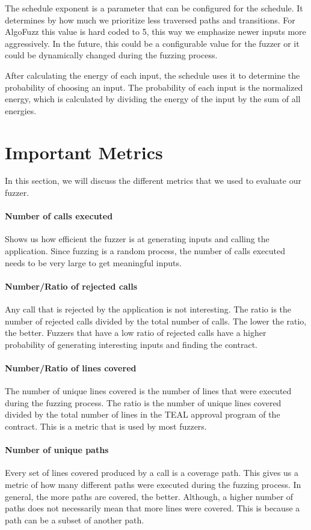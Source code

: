The schedule exponent is a parameter that can be configured for the schedule.
It determines by how much we prioritize less traversed paths and transitions.
For AlgoFuzz this value is hard coded to 5, this way we emphasize newer inputs more aggressively.
In the future, this could be a configurable value for the fuzzer or it could be dynamically changed during the fuzzing process.

After calculating the energy of each input, the schedule uses it to determine the probability of choosing an input.
The probability of each input is the normalized energy, which is calculated by dividing the energy of the input by the sum of all energies.

\section{Important Metrics}
In this section, we will discuss the different metrics that we used to evaluate our fuzzer.

\paragraph{Number of calls executed} Shows us how efficient the fuzzer is at generating inputs and calling the application.
Since fuzzing is a random process, the number of calls executed needs to be very large to get meaningful inputs.

\paragraph{Number/Ratio of rejected calls} Any call that is rejected by the application is not interesting.
The ratio is the number of rejected calls divided by the total number of calls.
The lower the ratio, the better.
Fuzzers that have a low ratio of rejected calls have a higher probability of generating interesting inputs and finding the contract.

\paragraph{Number/Ratio of lines covered} The number of unique lines covered is the number of lines that were executed during the fuzzing process.
The ratio is the number of unique lines covered divided by the total number of lines in the \ac{TEAL} approval program of the contract.
This is a metric that is used by most fuzzers.

\paragraph{Number of unique paths} Every set of lines covered produced by a call is a coverage path.
This gives us a metric of how many different paths were executed during the fuzzing process.
In general, the more paths are covered, the better.
Although, a higher number of paths does not necessarily mean that more lines were covered.
This is because a path can be a subset of another path.

